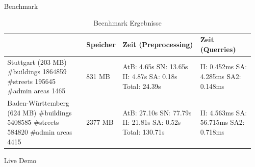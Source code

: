 \documentclass[8pt, t,
aspectratio=169,%
]{beamer}
\begin{document}
\begin{frame}{Benchmark}
  \begin{table}[h]
    \centering
    \begin{tabularx}{\textwidth}{|X|X|X|X|}
    \hline
     & Speicher & Zeit (Preprocessing) & Zeit (Querries) \\
    \hline
    Stuttgart (203 MB) \newline \newline \#buildings 1864859 \newline \#streets 195645 \newline \#admin areas 1465 & 831 MB & AtB: 4.65s \newline SN: 13.65s \newline II: 4.87s \newline SA: 0.18s \newline Total: 24.39s & II: 0.452ms \newline SA: 4.285ms \newline \newline SA2: 0.148ms \\
    \hline
    Baden-Württemberg (624 MB) \newline \newline \#buildings 5408585 \newline \#streets 584820 \newline \#admin areas 4415 & 2377 MB & AtB: 27.10s \newline SN: 77.79s \newline II: 21.81s \newline SA: 0.52s \newline Total: 130.71s & II: 4.563ms \newline SA: 56.715ms \newline \newline SA2: 0.718ms \\
    \hline
    \end{tabularx}
    \caption{Becnhmark Ergebnisse}
  \end{table}
\end{frame}

\begin{frame}{Live Demo}
\end{frame}



%
\end{document}
